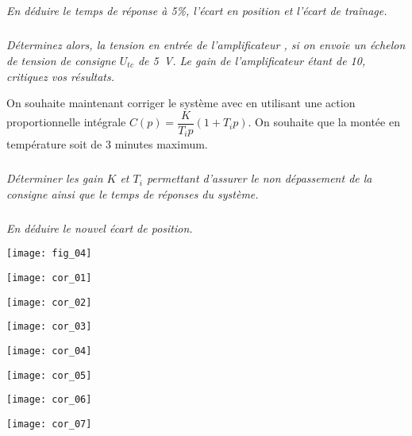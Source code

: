 \begin{multicols}{2}
\subparagraph{}\textit{En déduire le temps de réponse à 5\%, l'écart en position et l'écart de traînage.}

\subparagraph{}\textit{Déterminez alors, la tension en entrée de l'amplificateur , si on envoie un échelon de tension de consigne $U_{tc}$ de \SI{5}{V}. Le gain de l'amplificateur étant de 10, critiquez vos résultats.}

On souhaite maintenant corriger le système avec en utilisant une action proportionnelle intégrale $C(p)=\dfrac{K}{T_i p}\left( 1+T_i p\right)$. On souhaite que la montée en température soit de 3 minutes maximum. 

\subparagraph{}\textit{Déterminer les gain $K$ et $T_i$ permettant d'assurer le non dépassement de la consigne ainsi que le temps de réponses du système.}


\subparagraph{}\textit{En déduire le nouvel écart de position.}

\begin{center}
\texttt{[image: fig\_04]}
\end{center}


\end{multicols}
\newpage
\ifprof
\begin{center}
\texttt{[image: cor\_01]}
\end{center}
\begin{center}
\texttt{[image: cor\_02]}
\end{center}
\begin{center}
\texttt{[image: cor\_03]}
\end{center}
\begin{center}
\texttt{[image: cor\_04]}
\end{center}
\begin{center}
\texttt{[image: cor\_05]}
\end{center}
\begin{center}
\texttt{[image: cor\_06]}
\end{center}
\begin{center}
\texttt{[image: cor\_07]}
\end{center}
\else
\fi

